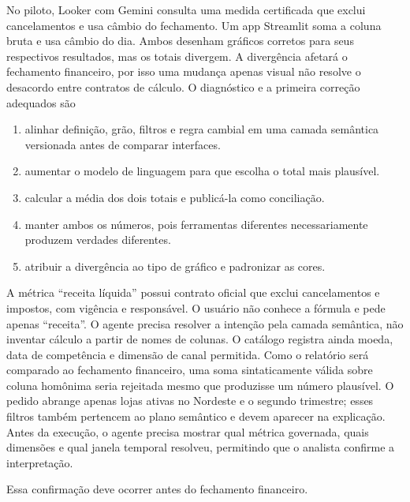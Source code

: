\documentclass[12pt,a4paper]{article}
\begin{document}
\TextoBase
No piloto, Looker com Gemini consulta uma medida certificada que exclui cancelamentos e usa câmbio do fechamento. Um app Streamlit soma a coluna bruta e usa câmbio do dia. Ambos desenham gráficos corretos para seus respectivos resultados, mas os totais divergem.
A divergência afetará o fechamento financeiro, por isso uma mudança apenas visual não resolve o desacordo entre contratos de cálculo.
\FonteDidatica
\Comando O diagnóstico e a primeira correção adequados são
\begin{enumerate}[label=\Alph*)]
  \item alinhar definição, grão, filtros e regra cambial em uma camada semântica versionada antes de comparar interfaces.
  \item aumentar o modelo de linguagem para que escolha o total mais plausível.
  \item calcular a média dos dois totais e publicá-la como conciliação.
  \item manter ambos os números, pois ferramentas diferentes necessariamente produzem verdades diferentes.
  \item atribuir a divergência ao tipo de gráfico e padronizar as cores.
\end{enumerate}


\TextoBase

A métrica ``receita líquida'' possui contrato oficial que exclui cancelamentos e impostos, com vigência e responsável. O usuário não conhece a fórmula e pede apenas ``receita''. O agente precisa resolver a intenção pela camada semântica, não inventar cálculo a partir de nomes de colunas. O catálogo registra ainda moeda, data de competência e dimensão de canal permitida. Como o relatório será comparado ao fechamento financeiro, uma soma sintaticamente válida sobre coluna homônima seria rejeitada mesmo que produzisse um número plausível. O pedido abrange apenas lojas ativas no Nordeste e o segundo trimestre; esses filtros também pertencem ao plano semântico e devem aparecer na explicação. Antes da execução, o agente precisa mostrar qual métrica governada, quais dimensões e qual janela temporal resolveu, permitindo que o analista confirme a interpretação.

Essa confirmação deve ocorrer antes do fechamento financeiro.
\end{document}
